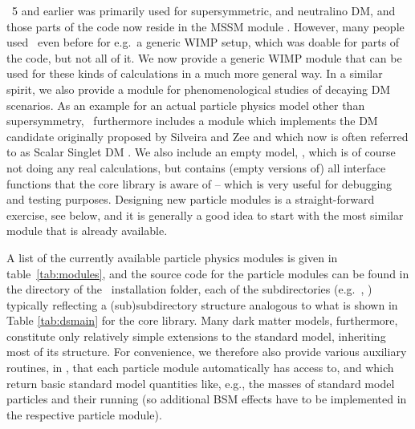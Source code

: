 \ds\ 5 and earlier was primarily used for supersymmetric, and neutralino DM, and those 
parts of the code now reside in the MSSM module . However, many people 
used \ds\ even before for e.g.\ a generic WIMP setup, which was doable for parts of the 
code, but not all of it. We now provide a generic WIMP module  that 
can be used for these kinds of calculations in a much more general way. 
 In a similar spirit,
we also provide a module  for phenomenological studies
of decaying DM scenarios. As an example for an actual particle physics model
other than supersymmetry,
\ds\  furthermore includes a module  which implements the
DM candidate originally proposed by Silveira and Zee \cite{Silveira:1985rk} and which 
now is often
referred to as Scalar Singlet DM \cite{McDonald:1993ex,Burgess:2000yq,Cline:2013gha}.
We also include an empty model, , 
which is of course not doing any real calculations, but contains (empty versions of) all
interface functions that the core library is aware of -- which is very useful for debugging and
testing purposes. Designing new particle modules is 
a straight-forward exercise, see below, and it is generally a good idea 
to start with the most similar module that is already available.

A list of the currently available particle physics modules is given in table~\ref{tab:modules},
and the source code for the particle modules can be found in the  
directory of the \ds\ installation folder, each of the subdirectories 
(e.g.~, ) typically 
reflecting a (sub)subdirectory structure analogous to what is shown in Table \ref{tab:dsmain}
for the core library. 
%
Many dark matter models, furthermore, constitute only relatively simple extensions to the 
standard model, inheriting most of its structure. For convenience,
we therefore also provide various auxiliary routines, in , that each particle module 
automatically has access to, and which return basic standard model quantities like, e.g., the masses
of standard model particles and their running (so additional BSM effects have to be implemented in the
respective particle module).


